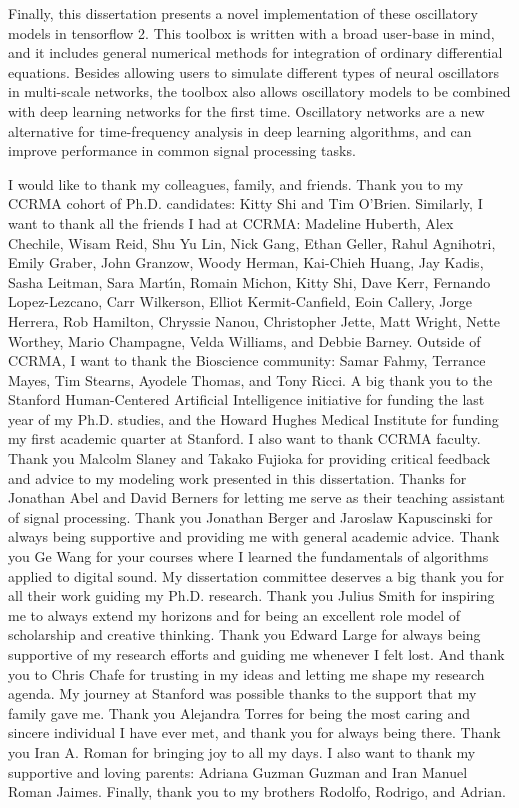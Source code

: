 \documentclass{report}
\begin{document}
Finally, this dissertation presents a novel implementation of these oscillatory models in tensorflow 2. This toolbox is written with a broad user-base in mind, and it includes general numerical methods for integration of ordinary differential equations. Besides allowing users to simulate different types of neural oscillators in multi-scale networks, the toolbox also allows oscillatory models to be combined with deep learning networks for the first time. Oscillatory networks are a new alternative for time-frequency analysis in deep learning algorithms, and can improve performance in common signal processing tasks.

I would like to thank my colleagues, family, and friends. Thank you to my CCRMA cohort of Ph.D. candidates: Kitty Shi and Tim O'Brien. Similarly, I want to thank all the friends I had at CCRMA: Madeline Huberth, Alex Chechile, Wisam Reid, Shu Yu Lin, Nick Gang, Ethan Geller, Rahul Agnihotri, Emily Graber, John Granzow, Woody Herman, Kai-Chieh Huang, Jay Kadis, Sasha Leitman, Sara Martı́n, Romain Michon, Kitty Shi, Dave Kerr, Fernando Lopez-Lezcano, Carr Wilkerson, Elliot Kermit-Canfield, Eoin Callery, Jorge Herrera, Rob Hamilton, Chryssie Nanou, Christopher Jette, Matt Wright, Nette Worthey, Mario Champagne, Velda Williams, and Debbie Barney. Outside of CCRMA, I want to thank the Bioscience community: Samar Fahmy, Terrance Mayes, Tim Stearns, Ayodele Thomas, and Tony Ricci. 
A big thank you to the Stanford Human-Centered Artificial Intelligence initiative for funding the last year of my Ph.D. studies, and the Howard Hughes Medical Institute for funding my first academic quarter at Stanford. 
I also want to thank CCRMA faculty. Thank you Malcolm Slaney and Takako Fujioka for providing critical feedback and advice to my modeling work presented in this dissertation. Thanks for Jonathan Abel and David Berners for letting me serve as their teaching assistant of signal processing. Thank you Jonathan Berger and Jaroslaw Kapuscinski for always being supportive and providing me with general academic advice. Thank you Ge Wang for your courses where I learned the fundamentals of algorithms applied to digital sound. 
My dissertation committee deserves a big thank you for all their work guiding my Ph.D. research. Thank you Julius Smith for inspiring me to always extend my horizons and for being an excellent role model of scholarship and creative thinking. Thank you Edward Large for always being supportive of my research efforts and guiding me whenever I felt lost. And thank you to Chris Chafe for trusting in my ideas and letting me shape my research agenda. 
My journey at Stanford was possible thanks to the support that my family gave me. Thank you Alejandra Torres for being the most caring and sincere individual I have ever met, and thank you for always being there. Thank you Iran A. Roman for bringing joy to all my days. I also want to thank my supportive and loving parents: Adriana Guzman Guzman and Iran Manuel Roman Jaimes. Finally, thank you to my brothers Rodolfo, Rodrigo, and Adrian.
\afterpreface
\end{document}
